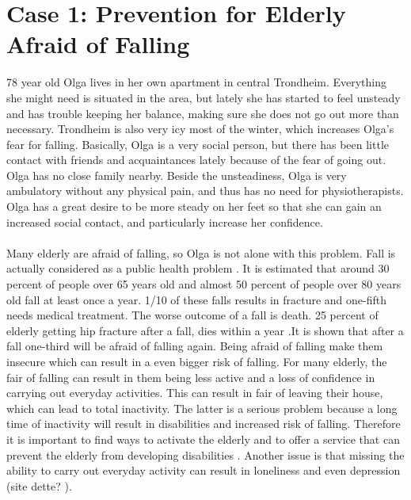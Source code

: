 \chapter{Case 1: Prevention for Elderly Afraid of Falling}
78 year old Olga lives in her own apartment in central Trondheim. Everything she might need is situated in the area, but lately she has started  to feel unsteady and has trouble keeping her balance, making sure she does not go out more than necessary. Trondheim is also very icy most of the winter, which increases Olga's fear for falling. Basically, Olga is a very social person, but there has been little contact with friends and acquaintances lately because of the fear of going out. Olga has no close family nearby. Beside the unsteadiness, Olga is very ambulatory without any physical pain, and thus has no need for physiotherapists. Olga has a great desire to be more steady on her feet so that she can gain an increased social contact, and particularly increase her confidence. \\ \\
Many elderly are afraid of falling, so Olga is not alone with this problem. Fall is actually considered as a public health problem  \cite{otago}.
It is estimated that around 30 percent of people over 65 years old and almost 50 percent of people over 80 years old fall at least once a year. 1/10 of these falls results in fracture and one-fifth needs medical treatment. The worse outcome of a fall is death. 25 percent of elderly getting hip fracture after a fall, dies within a year \cite{gruppetrening-trheim} \cite{larhalsbrudd}.It is shown that after a fall one-third will be afraid of falling again. Being afraid of falling make them insecure which can result in a even bigger risk of falling. For many elderly, the fair of falling can result in them being less active and a loss of confidence in carrying out everyday activities. This can result in fair of leaving their house, which can lead to total inactivity. The latter is a serious problem because a long time of inactivity will result in disabilities and increased risk of falling. Therefore it is important to find ways to activate the elderly and to offer a service that can prevent the elderly from developing disabilities \cite{gruppetrening-trheim}. Another issue is that missing the ability to carry out everyday activity can result in loneliness and even depression (site dette? ).\\ \\
